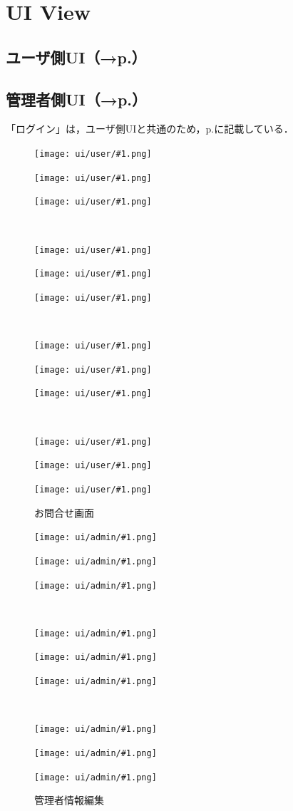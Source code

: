 \section{UI View}
\subsection*{ユーザ側UI（→p.\pageref{fig:ui-view:user}）}
\subsection*{管理者側UI（→p.\pageref{fig:ui-view:admin}）}
「ログイン」は，ユーザ側UIと共通のため，p.\pageref{fig:ui-view:user}に記載している．
\begin{figure}[p]
    \newcommand{\vuser}[2]{\begin{minipage}[b]{.32\textwidth}\centering\texttt{[image: ui/user/\#1.png]}\caption{#2}\end{minipage}}
    \centering\label{fig:ui-view:user}
    \vuser{0-ログイン}{ログイン}
    \vuser{1-利用登録}{利用登録}
    \vuser{2-トップページ画面}{トップページ}\\
    \vuser{3-楽曲登録:編集}{楽譜登録，編集}
    \vuser{4-マイページ}{マイページ}
    \vuser{10-楽曲操作決定}{楽譜詳細画面}\\
    \vuser{5-楽曲編集確認}{楽曲編集}
    \vuser{7-ユーザパスワード変更}{パスワード変更}
    \vuser{7-ユーザ情報編集}{ユーザ情報編集}\\
    \vuser{7-ユーザ情報編集エラー}{ユーザ情報編集エラー}
    \vuser{8-ユーザ情報削除確認}{ユーザ情報削除確認}
    \vuser{9-お問い合わせ}{お問合せ画面}
\end{figure}
\begin{figure}[p]
    \newcommand{\vadmin}[2]{\begin{minipage}[b]{.32\textwidth}\centering\texttt{[image: ui/admin/\#1.png]}\caption{#2}\end{minipage}}
    \centering
    \label{fig:ui-view:admin}
    \vadmin{0-トップページ}{トップページ}
    \vadmin{1-操作選択}{操作選択}
    \vadmin{2-ユーザ情報編集}{ユーザ情報編集}\\
    \vadmin{2-ユーザ情報編集エラー}{ユーザ情報編集エラー}
    \vadmin{2-ユーザ情報編集確認}{ユーザ情報編集確認}
    \vadmin{3-ユーザ削除確認}{ユーザ削除確認}\\
    \vadmin{4-ユーザ楽曲DB}{楽譜DB一覧}
    \vadmin{4-ユーザ楽曲削除確認}{楽譜削除確認}
    \vadmin{5-管理者情報編集}{管理者情報編集}
\end{figure}